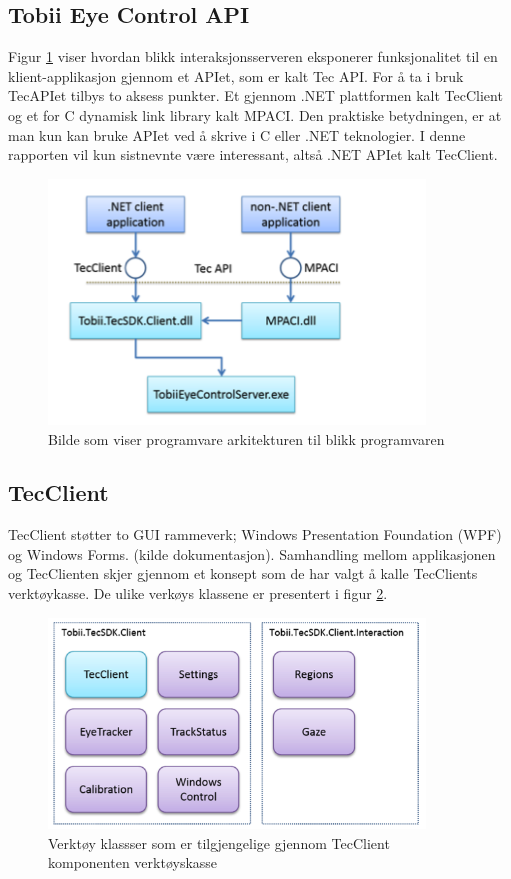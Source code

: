 \documentclass[phd,tocprelim]{cornell}
\begin{document}
\subsection{Tobii Eye Control API }

Figur \ref{fig:overview} viser hvordan blikk interaksjonsserveren eksponerer funksjonalitet til en klient-applikasjon gjennom et APIet, som er kalt Tec API. For å ta i bruk TecAPIet tilbys to aksess punkter. Et gjennom .NET plattformen kalt TecClient og et for C dynamisk link library kalt MPACI.  Den praktiske betydningen, er at man kun kan bruke APIet ved å skrive i C eller .NET teknologier. I denne rapporten vil kun sistnevnte være interessant, altså .NET APIet kalt TecClient.


\begin{figure}[ht!]
\centering
\includegraphics[width=100mm]{SoftwareArchitectureOverview}
\caption{Bilde som viser programvare arkitekturen til blikk programvaren}
\label{fig:overview}
\end{figure}


\subsection{TecClient}

TecClient støtter to GUI rammeverk; Windows Presentation Foundation (\gls{WPF}) og Windows Forms. 
\cite{Dokumentasjonen} (kilde dokumentasjon).  Samhandling mellom applikasjonen og TecClienten skjer gjennom et konsept som de har valgt å kalle TecClients verktøykasse. De ulike verkøys klassene er presentert i figur \ref{fig:toolbox}. 

\begin{figure}[ht!]
\centering
\includegraphics[width=100mm]{Toolbox}
\caption{Verktøy klassser som er tilgjengelige gjennom TecClient komponenten verktøyskasse}
\label{fig:toolbox}
\end{figure}
\end{document}
